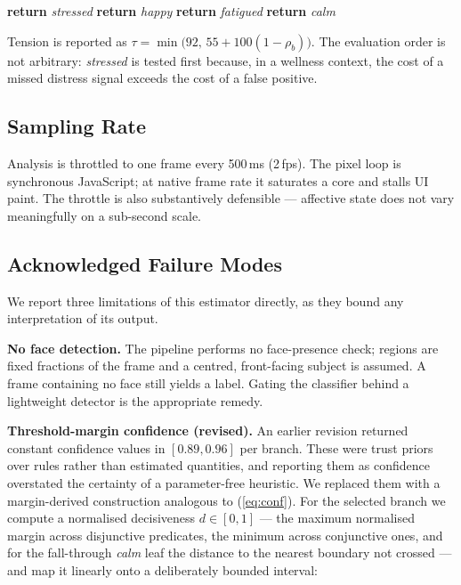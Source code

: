 \documentclass[conference]{IEEEtran}
\begin{document}
\begin{algorithmic}[1]
    \STATE \textbf{return} \textit{stressed}
    \STATE \textbf{return} \textit{happy}
    \STATE \textbf{return} \textit{fatigued}
\ELSE
    \STATE \textbf{return} \textit{calm}
\ENDIF
\end{algorithmic}

Tension is reported as
$\tau = \min\bigl(92,\, 55 + 100(1 - \rho_b)\bigr)$.
The evaluation order is not arbitrary: \textit{stressed} is tested first
because, in a wellness context, the cost of a missed distress signal exceeds
the cost of a false positive.

\subsection{Sampling Rate}
Analysis is throttled to one frame every 500\,ms (2\,fps). The pixel loop is
synchronous JavaScript; at native frame rate it saturates a core and stalls UI
paint. The throttle is also substantively defensible --- affective state does
not vary meaningfully on a sub-second scale.

\subsection{Acknowledged Failure Modes}
We report three limitations of this estimator directly, as they bound any
interpretation of its output.

\textbf{No face detection.} The pipeline performs no face-presence check;
regions are fixed fractions of the frame and a centred, front-facing subject
is assumed. A frame containing no face still yields a label. Gating the
classifier behind a lightweight detector is the appropriate remedy.

\textbf{Threshold-margin confidence (revised).} An earlier revision returned
constant confidence values in $[0.89, 0.96]$ per branch. These were trust
priors over rules rather than estimated quantities, and reporting them as
confidence overstated the certainty of a parameter-free heuristic. We replaced
them with a margin-derived construction analogous to (\ref{eq:conf}). For the
selected branch we compute a normalised decisiveness $d \in [0,1]$ --- the
maximum normalised margin across disjunctive predicates, the minimum across
conjunctive ones, and for the fall-through \textit{calm} leaf the distance to
the nearest boundary not crossed --- and map it linearly onto a deliberately
bounded interval:
\end{document}
